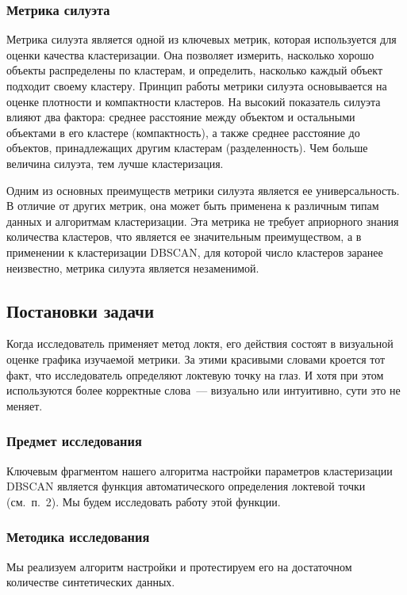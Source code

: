 \documentclass[a4paper,12pt]{article}
\begin{document}
\subsubsection{Метрика силуэта}

Метрика силуэта является одной из ключевых метрик, которая используется для оценки качества кластеризации. Она позволяет измерить, насколько хорошо объекты распределены по кластерам, и определить, насколько каждый объект подходит своему кластеру. Принцип работы метрики силуэта основывается на оценке плотности и компактности кластеров. На высокий показатель силуэта влияют два фактора: среднее расстояние между объектом и остальными объектами в его кластере (компактность), а также среднее расстояние до объектов, принадлежащих другим кластерам (разделенность). Чем больше величина силуэта, тем лучше кластеризация.

Одним из основных преимуществ метрики силуэта является ее универсальность. В отличие от других метрик, она может быть применена к различным типам данных и алгоритмам кластеризации. Эта метрика не требует априорного знания количества кластеров, что является ее значительным преимуществом, а в применении к кластеризации DBSCAN, для которой число кластеров заранее неизвестно, метрика силуэта является незаменимой.

\subsection{Постановки задачи}
Когда исследователь применяет метод локтя, его действия состоят в визуальной оценке графика изучаемой метрики. За этими красивыми словами кроется тот факт, что исследователь определяют локтевую точку на глаз. И хотя при этом используются более корректные слова — визуально или интуитивно, сути это не меняет.

\subsubsection{Предмет исследования}

 Ключевым фрагментом нашего алгоритма настройки параметров кластеризации DBSCAN является функция автоматического определения локтевой точки (см. п. 2). Мы будем исследовать работу этой функции.

\subsubsection{Методика исследования} 

Мы реализуем алгоритм настройки и протестируем его на достаточном количестве синтетических данных.
\end{document}
